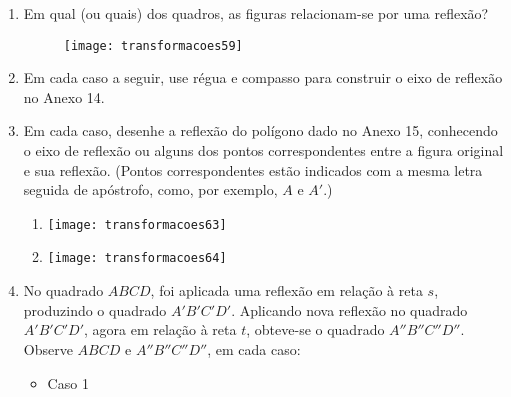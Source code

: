 \begin{enumerate}
\item Em qual (ou quais) dos quadros, as figuras relacionam-se por uma reflexão?
 
\begin{figure}[H]
\centering

\texttt{[image: transformacoes59]}
\end{figure}

\item Em cada caso a seguir, use régua e compasso para construir o eixo de reflexão no Anexo 14.
\begin{enumerate}


\end{enumerate}	
 

\item Em cada caso, desenhe a reflexão do polígono dado no Anexo 15, conhecendo o eixo de reflexão ou alguns dos pontos correspondentes entre a figura original e sua reflexão. (Pontos correspondentes estão indicados com a mesma letra seguida de apóstrofo, como, por exemplo, $A$ e $A'$.)
\begin{enumerate}
\item {}
{
\texttt{[image: transformacoes63]}
}
 
\item {}
{
\texttt{[image: transformacoes64]}
}
\end{enumerate}
 

\item No quadrado $ABCD$, foi aplicada uma reflexão em relação à reta $s$, produzindo o quadrado $A'B'C'D'$. Aplicando nova reflexão no quadrado $A'B'C'D'$, agora em relação à reta $t$, obteve-se o quadrado $A''B''C''D''$.  
Observe $ABCD$ e $A''B''C''D''$, em cada caso:
 
\begin{itemize}
\item Caso 1
 \begin{figure}[H]
 \centering
 

\end{figure}
\end{itemize}
\end{enumerate}
